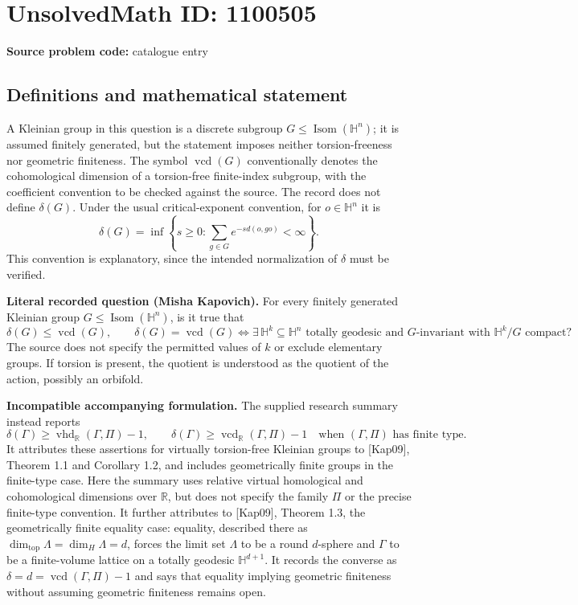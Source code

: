 \documentclass[11pt]{article}
\newcommand{\R}{\mathbb{R}}
\begin{document}
\section*{UnsolvedMath ID: 1100505}
\textbf{Source problem code:} catalogue entry
\subsection{Definitions and mathematical statement}
A Kleinian group in this question is a discrete subgroup $G\leq\operatorname{Isom}(\mathbb H^n)$; it is assumed finitely generated, but the statement imposes neither torsion-freeness nor geometric finiteness. The symbol $\operatorname{vcd}(G)$ conventionally denotes the cohomological dimension of a torsion-free finite-index subgroup, with the coefficient convention to be checked against the source. The record does not define $\delta(G)$. Under the usual critical-exponent convention, for $o\in\mathbb H^n$ it is
\[
 \delta(G)=\inf\left\{s\geq0:\sum_{g\in G}e^{-s d(o,go)}<\infty\right\}.
\]
This convention is explanatory, since the intended normalization of $\delta$ must be verified.

\textbf{Literal recorded question (Misha Kapovich).} For every finitely generated Kleinian group $G\leq\operatorname{Isom}(\mathbb H^n)$, is it true that
\[
 \delta(G)\leq\operatorname{vcd}(G),
 \qquad
 \delta(G)=\operatorname{vcd}(G)
 \Longleftrightarrow
 \exists\,\mathbb H^k\subseteq\mathbb H^n\text{ totally geodesic and $G$-invariant with }\mathbb H^k/G\text{ compact}?
\]
The source does not specify the permitted values of $k$ or exclude elementary groups. If torsion is present, the quotient is understood as the quotient of the action, possibly an orbifold.

\textbf{Incompatible accompanying formulation.} The supplied research summary instead reports
\[
 \delta(\Gamma)\geq\operatorname{vhd}_{\R}(\Gamma,\Pi)-1,
 \qquad
 \delta(\Gamma)\geq\operatorname{vcd}_{\R}(\Gamma,\Pi)-1
 \quad\text{when $(\Gamma,\Pi)$ has finite type}.
\]
It attributes these assertions for virtually torsion-free Kleinian groups to [Kap09], Theorem 1.1 and Corollary 1.2, and includes geometrically finite groups in the finite-type case. Here the summary uses relative virtual homological and cohomological dimensions over $\R$, but does not specify the family $\Pi$ or the precise finite-type convention. It further attributes to [Kap09], Theorem 1.3, the geometrically finite equality case: equality, described there as $\dim_{\mathrm{top}}\Lambda=\dim_H\Lambda=d$, forces the limit set $\Lambda$ to be a round $d$-sphere and $\Gamma$ to be a finite-volume lattice on a totally geodesic $\mathbb H^{d+1}$. It records the converse as $\delta=d=\operatorname{vcd}(\Gamma,\Pi)-1$ and says that equality implying geometric finiteness without assuming geometric finiteness remains open.
\end{document}
